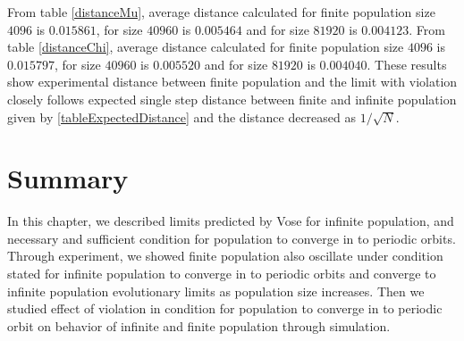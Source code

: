 \newpage

From table \ref{distanceMu}, average distance calculated for finite population size $4096$ is $0.015861$, 
for size $40960$ is $0.005464$ and for size $81920$ is $0.004123$. From table \ref{distanceChi}, 
average distance calculated for finite population size $4096$ is $0.015797$, 
for size $40960$ is $0.005520$ and for size $81920$ is $0.004040$.
These results show experimental distance between finite population and the limit with violation closely follows expected single step distance 
between finite and infinite population given by \ref{tableExpectedDistance} and the distance decreased as $1/\sqrt{N}$.


\section{Summary}
In this chapter, we described limits predicted by Vose for infinite population, and necessary and sufficient condition for population to converge in to periodic orbits. Through experiment, we showed finite population also oscillate under condition stated for infinite population to converge in to periodic orbits and converge to infinite population evolutionary limits as population size increases. Then we studied effect of violation in condition for population to converge in to periodic orbit on behavior of infinite and finite population through simulation.





 
